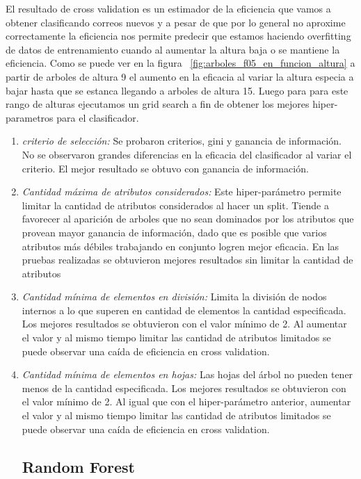 	El resultado de cross validation es un estimador de la eficiencia que vamos a obtener clasificando correos nuevos y a pesar de que por lo general no aproxime correctamente la eficiencia nos permite predecir que estamos haciendo overfitting de datos de entrenamiento cuando al aumentar la altura baja o se mantiene la eficiencia. Como se puede ver en la figura ~\ref{fig:arboles_f05_en_funcion_altura} a partir de arboles de altura 9 el aumento en la eficacia al variar la altura especia a bajar hasta que se estanca llegando a arboles de altura 15. 
    Luego para para este rango de alturas ejecutamos un grid search a fin de obtener los mejores hiper-parametros para el clasificador. 
 \begin{enumerate}
\item \textit{criterio de selección:} Se probaron criterios, gini y ganancia de información. No se observaron grandes diferencias en la eficacia del clasificador al variar el criterio. El mejor resultado se obtuvo con ganancia de información. 
\item \textit{Cantidad máxima de atributos considerados:} Este hiper-parámetro permite limitar la cantidad de atributos considerados al hacer un split.  Tiende a favorecer al aparición de arboles que no sean dominados por los atributos que provean mayor ganancia de información, dado que es posible que varios atributos más débiles trabajando en conjunto logren mejor eficacia.  En las pruebas realizadas se obtuvieron mejores resultados sin limitar la cantidad de atributos
\item \textit{Cantidad mínima de elementos en división:} Limita la división de nodos internos a lo que superen en cantidad de elementos la cantidad especificada. Los mejores resultados se obtuvieron con el valor mínimo de 2. Al aumentar el valor y al mismo tiempo limitar las cantidad de atributos limitados se puede observar una caída de eficiencia en cross validation. 
\item \textit{Cantidad mínima de elementos en hojas:} Las hojas del árbol no pueden tener menos de la cantidad especificada. Los mejores resultados se obtuvieron con el valor mínimo de 2. Al igual que con el hiper-parámetro anterior, aumentar el valor y al mismo tiempo limitar las cantidad de atributos limitados se puede observar una caída de eficiencia en cross validation.  

\subsection{Random Forest}

\end{enumerate}
